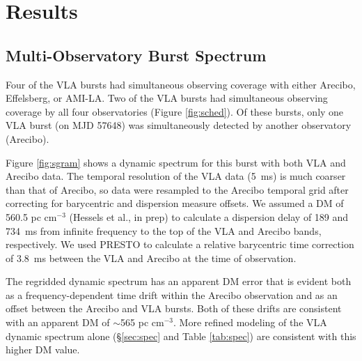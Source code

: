 \documentclass[twocolumn]{aastex61}
\begin{document}
\section{Results}
\label{sec:res}

\subsection{Multi-Observatory Burst Spectrum}

Four of the VLA bursts had simultaneous observing coverage with either Arecibo, Effelsberg, or AMI-LA. Two of the VLA bursts had simultaneous observing coverage by all four observatories (Figure \ref{fig:sched}). Of these bursts, only one VLA burst (on MJD 57648) was simultaneously detected by another observatory (Arecibo). 


Figure \ref{fig:sgram} shows a dynamic spectrum for this burst with both VLA and Arecibo data. The temporal resolution of the VLA data (5~ms) is much coarser than that of Arecibo, so data were resampled to the Arecibo temporal grid after correcting for barycentric and dispersion measure offsets. We assumed a DM of 560.5 pc cm$^{-3}$ (Hessels et al., in prep) to calculate a dispersion delay of 189 and 734~ms from infinite frequency to the top of the VLA and Arecibo bands, respectively. We used PRESTO \citep{2001PhDT.......123R} to calculate a relative barycentric time correction of 3.8~ms between the VLA and Arecibo at the time of observation.

The regridded dynamic spectrum has an apparent DM error that is evident both as a frequency-dependent time drift within the Arecibo observation and as an offset between the Arecibo and VLA bursts. Both of these drifts are consistent with an apparent DM of $\sim$565 pc cm$^{-3}$. More refined modeling of the VLA dynamic spectrum alone (\S \ref{sec:spec} and Table \ref{tab:spec}) are consistent with this higher DM value.
\end{document}

